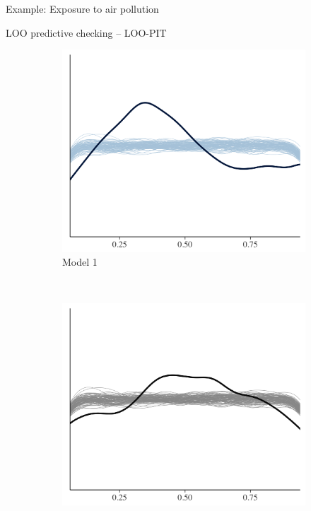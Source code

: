 \documentclass[t]{beamer}
\begin{document}
\begin{frame}
\begin{figure}
\end{figure}

\end{frame}

\begin{frame}

  {\Large\color{navyblue} Example: Exposure to air pollution}


  LOO predictive checking -- LOO-PIT

\begin{figure}
\centering
\begin{subfigure}{0.31\textwidth}
\includegraphics[width=\textwidth]{ppc_loo_pit_overlay1.png}
\caption{Model 1}
\end{subfigure}
~
\begin{subfigure}{0.31\textwidth}
\includegraphics[width=\textwidth]{ppc_loo_pit_overlay2.png}

\end{subfigure}
\end{figure}
\end{frame}
\end{document}
